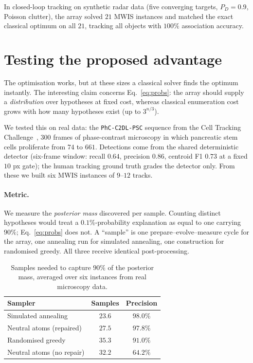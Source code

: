 \documentclass[10pt,twocolumn]{article}
\begin{document}
In closed-loop tracking on synthetic radar data (five converging targets, $P_D =
0.9$, Poisson clutter), the array solved $21$ MWIS instances and matched the exact
classical optimum on all $21$, tracking all objects with $100\%$ association
accuracy.

\section{Testing the proposed advantage}

The optimisation works, but at these sizes a classical solver finds the optimum
instantly. The interesting claim concerns Eq.~\eqref{eq:probs}: the array should
supply a \emph{distribution} over hypotheses at fixed cost, whereas classical
enumeration cost grows with how many hypotheses exist (up to $3^{n/3}$).

We tested this on real data: the \texttt{PhC-C2DL-PSC} sequence from the Cell
Tracking Challenge~\cite{ctc}, $300$ frames of phase-contrast microscopy in which
pancreatic stem cells proliferate from $74$ to $661$. Detections come from the
shared deterministic detector (six-frame window: recall $0.64$, precision
$0.86$, centroid F1 $0.73$ at a fixed $10$ px gate); the human tracking ground
truth grades the detector only. From
these we built six MWIS instances of $9$--$12$ tracks.

\paragraph{Metric.} We measure the \emph{posterior mass} discovered per sample.
Counting distinct hypotheses would treat a $0.1\%$-probability explanation as
equal to one carrying $90\%$; Eq.~\eqref{eq:probs} does not. A ``sample'' is one
prepare--evolve--measure cycle for the array, one annealing run for simulated
annealing, one construction for randomised greedy. All three receive identical
post-processing.

\begin{table}[H]
  \centering
  \small
  \caption{Samples needed to capture $90\%$ of the posterior mass, averaged over
  six instances from real microscopy data.}
  \label{tab:route1}
  \begin{tabular}{lcc}
    \toprule
    Sampler & Samples & Precision \\
    \midrule
    Simulated annealing        & $\mathbf{23.6}$ & $98.0\%$ \\
    Neutral atoms (repaired)   & $27.5$          & $\mathbf{97.8\%}$ \\
    Randomised greedy          & $35.3$          & $91.0\%$ \\
    Neutral atoms (no repair)  & $32.2$          & $64.2\%$ \\
    \bottomrule
  \end{tabular}
\end{table}
\end{document}
